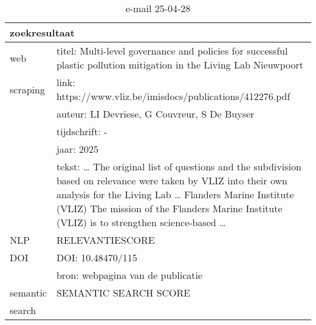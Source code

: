 \begin{table}[h!]
    \caption{e-mail 25-04-28}
    \centering
    \begin{tabularx}{\textwidth}{|p{4cm}|X|} 
        \hline
        \multicolumn{2}{|X|}{\textbf{zoekresultaat}} \\
        \hline
        web &titel: Multi-level governance and policies for successful plastic pollution mitigation in the Living Lab Nieuwpoort\\
        scraping&link: https://www.vliz.be/imisdocs/publications/412276.pdf\\
        &auteur: LI Devriese, G Couvreur, S De Buyser\\
        &tijdschrift: -\\
        &jaar: 2025\\
        &tekst: … The original list of questions and the subdivision based on relevance were taken by VLIZ into their own analysis for the Living Lab … Flanders Marine Institute (VLIZ) The mission of the Flanders Marine Institute (VLIZ) is to strengthen science-based …\\
        \hline
        NLP&RELEVANTIESCORE\\
        \hline
        DOI&DOI: 10.48470/115\\
        &bron: webpagina van de publicatie\\
        \hline
        semantic&SEMANTIC SEARCH SCORE\\
        search&\\
        \hline
    \end{tabularx}
    \label{table:email20250428}
\end{table}
